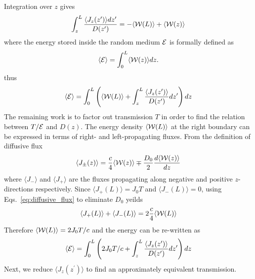 Integration over $z$ gives
\begin{equation}
\int_z^L\frac{\langle J_z(z^\prime)\rangle dz^\prime}{D(z^\prime)}=-\langle {\cal W}(L)\rangle + \langle {\cal W}(z)\rangle
\label{eq:E1}
\end{equation}
where the energy stored inside the random medium ${\cal E}$ is formally defined as
\begin{equation}
\langle {\cal E} \rangle =\int_0^L\langle {\cal W}(z)\rangle dz.
\label{eq:Energy_definition}
\end{equation}
thus
\begin{equation}
\langle {\cal E} \rangle = \int_0^L \left( \langle {\cal W}(L)\rangle + \int_z^L\frac{\langle J_z(z^\prime)\rangle }{D(z^\prime)}dz^\prime\right) dz
\end{equation}
The remaining work is to factor out transmission $T$ in order to find the relation between $T/{\cal E}$ and $D(z)$. The energy density $\langle {\cal W}(L)\rangle$ at the right boundary can be expressed in terms of right- and left-propagating fluxes. From the definition of diffusive flux \cite{1953_Morse}
\begin{equation}
\langle J_{\pm}(z)\rangle = \frac{c}{4} \langle {\cal W}(z)\rangle \mp \frac{D_0}{2} \frac{d\langle {\cal W}(z)\rangle }{dz}
\label{eq:diffusive_flux}
\end{equation}
where $ \langle J_{-}\rangle$ and $ \langle J_{+}\rangle $ are the fluxes propagating along negative and positive $z$-directions respectively. Since $\langle J_+(L)\rangle=J_0T$ and $\langle J_-(L)\rangle=0$, using Eqs.~\ref{eq:diffusive_flux} to eliminate $D_0$ yeilds
\begin{equation}
\langle J_+(L)\rangle + \langle J_-(L)\rangle = 2 \frac{c}{4}\langle {\cal W}(L)\rangle
\end{equation}
Therefore $\langle {\cal W}(L)\rangle=2J_0T/c$ and the energy can be re-written as
\begin{equation}
\langle {\cal E} \rangle = \int_0^L \left( 2J_0T/c + \int_z^L\frac{\langle J_z(z^\prime)\rangle}{D(z^\prime)}dz^\prime\right) dz
\end{equation}
Next, we reduce $\langle J_z(z^\prime)\rangle$ to find an approximately equivalent transmission.


